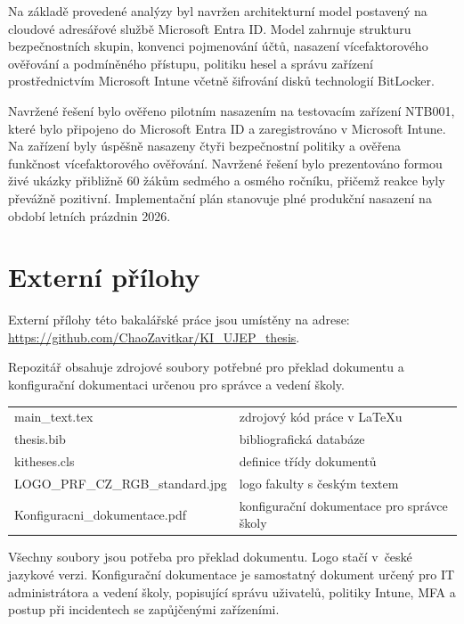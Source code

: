 \documentclass[male,czech,api_bc]{kitheses}
\begin{document}
Na základě provedené analýzy byl navržen architekturní model postavený na cloudové adresářové službě Microsoft Entra ID. Model zahrnuje strukturu bezpečnostních skupin, konvenci pojmenování účtů, nasazení vícefaktorového ověřování a podmíněného přístupu, politiku hesel a správu zařízení prostřednictvím Microsoft Intune včetně šifrování disků technologií BitLocker.

Navržené řešení bylo ověřeno pilotním nasazením na testovacím zařízení NTB001, které bylo připojeno do Microsoft Entra ID a zaregistrováno v Microsoft Intune. Na zařízení byly úspěšně nasazeny čtyři bezpečnostní politiky a ověřena funkčnost vícefaktorového ověřování. Navržené řešení bylo prezentováno formou živé ukázky přibližně 60 žákům sedmého a osmého ročníku, přičemž reakce byly převážně pozitivní. Implementační plán stanovuje plné produkční nasazení na období letních prázdnin 2026.

\sloppy
\printbibliography[title=Seznam použitých zdrojů]

\appendix

\chapter{Externí přílohy\label{sec:ep}}

Externí přílohy této bakalářské práce jsou umístěny na adrese:\\ \url{https://github.com/ChaoZavitkar/KI_UJEP_thesis}.

Repozitář obsahuje zdrojové soubory potřebné pro překlad dokumentu
a konfigurační dokumentaci určenou pro správce a vedení školy.

\begin{longtable}{ll}
\hline
main\_text.tex & zdrojový kód práce v \LaTeX{}u \\
thesis.bib & bibliografická databáze \\
kitheses.cls & definice třídy dokumentů \\
LOGO\_PRF\_CZ\_RGB\_standard.jpg & logo fakulty s českým textem \\
Konfiguracni\_dokumentace.pdf & konfigurační dokumentace pro správce školy \\
\hline
\end{longtable}

Všechny soubory jsou potřeba pro překlad dokumentu. Logo stačí
v~české jazykové verzi. Konfigurační dokumentace je samostatný dokument
určený pro IT administrátora a vedení školy, popisující správu uživatelů,
politiky Intune, MFA a postup při incidentech se zapůjčenými zařízeními.
\end{document}
